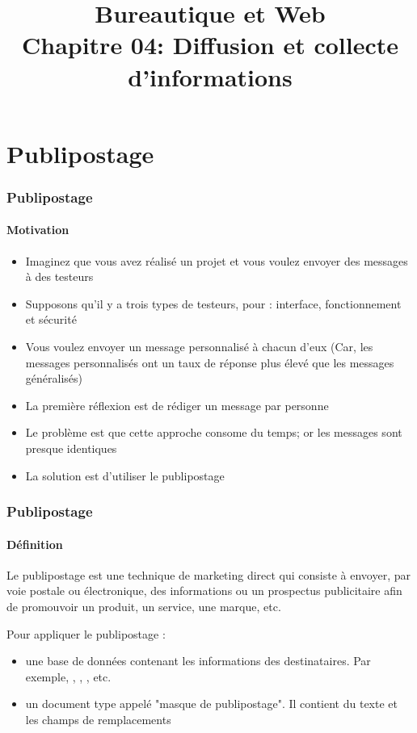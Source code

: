 \documentclass[xcolor=table]{beamer}
\title[BWEB: 03- Diffusion et collecte] %
{Bureautique et Web \\Chapitre 04: Diffusion et collecte d'informations}
\begin{document}
%
%

\section{Publipostage}

\begin{frame}
\frametitle{Publipostage}
\framesubtitle{Motivation}

\begin{itemize}
	\item Imaginez que vous avez réalisé un projet et vous voulez envoyer des messages à des testeurs
	\item Supposons qu'il y a trois types de testeurs, pour : interface, fonctionnement et sécurité 
	\item Vous voulez envoyer un message personnalisé à chacun d'eux (Car, les messages personnalisés ont un taux de réponse plus élevé que les messages généralisés) 
	\item La première réflexion est de rédiger un message par personne 
	\item Le problème est que cette approche consome du temps; or les messages sont presque identiques
	\item La solution est d'utiliser le publipostage
\end{itemize}

\end{frame}

\begin{frame}
\frametitle{Publipostage}
\framesubtitle{Définition}

\begin{definition}
	Le publipostage est une technique de marketing direct qui consiste à envoyer, par voie postale ou électronique, des informations ou un prospectus publicitaire afin de promouvoir un produit, un service, une marque, etc.
\end{definition}

Pour appliquer le publipostage : 
\begin{itemize}
	\item une base de données contenant les informations des destinataires. Par exemple, , , , etc.
	\item un document type appelé "masque de publipostage". Il contient du texte et les champs de remplacements	
\end{itemize}

\end{frame}
\end{document}
